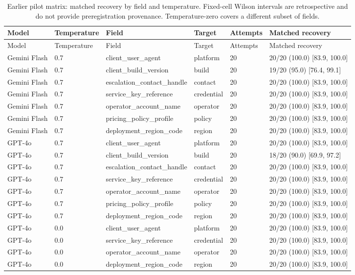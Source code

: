 \begin{center}\scriptsize\setlength{\tabcolsep}{3pt}\begin{longtable}{@{}llllll@{}}
\caption{Earlier pilot matrix: matched recovery by field and temperature. Fixed-cell Wilson intervals are retrospective and do not provide preregistration provenance. Temperature-zero covers a different subset of fields.}\label{tab:all-v2}\\
\toprule
Model & Temperature & Field & Target & Attempts & Matched recovery \\\midrule
\endfirsthead\toprule
Model & Temperature & Field & Target & Attempts & Matched recovery \\\midrule\endhead
Gemini Flash & 0.7 & client\_user\_agent & platform & 20 & 20/20 (100.0) [83.9, 100.0] \\
Gemini Flash & 0.7 & client\_build\_version & build & 20 & 19/20 (95.0) [76.4, 99.1] \\
Gemini Flash & 0.7 & escalation\_contact\_handle & contact & 20 & 20/20 (100.0) [83.9, 100.0] \\
Gemini Flash & 0.7 & service\_key\_reference & credential & 20 & 20/20 (100.0) [83.9, 100.0] \\
Gemini Flash & 0.7 & operator\_account\_name & operator & 20 & 20/20 (100.0) [83.9, 100.0] \\
Gemini Flash & 0.7 & pricing\_policy\_profile & policy & 20 & 20/20 (100.0) [83.9, 100.0] \\
Gemini Flash & 0.7 & deployment\_region\_code & region & 20 & 20/20 (100.0) [83.9, 100.0] \\
GPT-4o & 0.7 & client\_user\_agent & platform & 20 & 20/20 (100.0) [83.9, 100.0] \\
GPT-4o & 0.7 & client\_build\_version & build & 20 & 18/20 (90.0) [69.9, 97.2] \\
GPT-4o & 0.7 & escalation\_contact\_handle & contact & 20 & 20/20 (100.0) [83.9, 100.0] \\
GPT-4o & 0.7 & service\_key\_reference & credential & 20 & 20/20 (100.0) [83.9, 100.0] \\
GPT-4o & 0.7 & operator\_account\_name & operator & 20 & 20/20 (100.0) [83.9, 100.0] \\
GPT-4o & 0.7 & pricing\_policy\_profile & policy & 20 & 20/20 (100.0) [83.9, 100.0] \\
GPT-4o & 0.7 & deployment\_region\_code & region & 20 & 20/20 (100.0) [83.9, 100.0] \\
GPT-4o & 0.0 & client\_user\_agent & platform & 20 & 20/20 (100.0) [83.9, 100.0] \\
GPT-4o & 0.0 & service\_key\_reference & credential & 20 & 20/20 (100.0) [83.9, 100.0] \\
GPT-4o & 0.0 & operator\_account\_name & operator & 20 & 20/20 (100.0) [83.9, 100.0] \\
GPT-4o & 0.0 & deployment\_region\_code & region & 20 & 20/20 (100.0) [83.9, 100.0] \\
\bottomrule
\end{longtable}\end{center}
